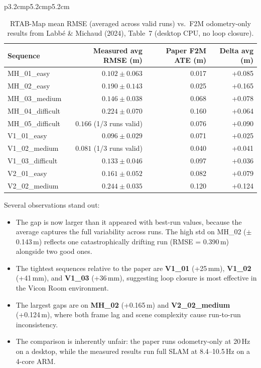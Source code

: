 \documentclass[11pt]{article}
\begin{document}
\begin{table}[ht]
\begin{tabular}{p{3.2cm}p{5.2cm}p{5.2cm}}
\begin{table}[H]
\centering
\small
\caption{RTAB-Map mean RMSE (averaged across valid runs) vs.\ F2M odometry-only results from Labb{\'e} \& Michaud (2024), Table~7 (desktop CPU, no loop closure).}
\label{tab:rtabmap_vs_paper}
\begin{tabular}{lrrr}
\toprule
Sequence & Measured avg RMSE (m) & Paper F2M ATE (m) & Delta avg (m) \\
\midrule
MH\_01\_easy       & $0.102 \pm 0.063$ & 0.017 & +0.085 \\
MH\_02\_easy       & $0.190 \pm 0.143$ & 0.025 & +0.165 \\
MH\_03\_medium     & $0.146 \pm 0.038$ & 0.068 & +0.078 \\
MH\_04\_difficult  & $0.224 \pm 0.070$ & 0.160 & +0.064 \\
MH\_05\_difficult  & $0.166$ (1/3 runs valid) & 0.076 & +0.090 \\
V1\_01\_easy       & $0.096 \pm 0.029$ & 0.071 & +0.025 \\
V1\_02\_medium     & $0.081$ (1/3 runs valid) & 0.040 & +0.041 \\
V1\_03\_difficult  & $0.133 \pm 0.046$ & 0.097 & +0.036 \\
V2\_01\_easy       & $0.161 \pm 0.052$ & 0.082 & +0.079 \\
V2\_02\_medium     & $0.244 \pm 0.035$ & 0.120 & +0.124 \\
\bottomrule
\end{tabular}
\end{table}

Several observations stand out:
\begin{itemize}
    \item The gap is now larger than it appeared with best-run values, because the average captures the full variability across runs. The high std on MH\_02 ($\pm$0.143\,m) reflects one catastrophically drifting run (RMSE = 0.390\,m) alongside two good ones.
    \item The tightest sequences relative to the paper are \textbf{V1\_01} (+25\,mm), \textbf{V1\_02} (+41\,mm), and \textbf{V1\_03} (+36\,mm), suggesting loop closure is most effective in the Vicon Room environment.
    \item The largest gaps are on \textbf{MH\_02} (+0.165\,m) and \textbf{V2\_02\_medium} (+0.124\,m), where both frame lag and scene complexity cause run-to-run inconsistency.
    \item The comparison is inherently unfair: the paper runs odometry-only at 20\,Hz on a desktop, while the measured results run full SLAM at 8.4--10.5\,Hz on a 4-core ARM.
\end{itemize}


\end{tabular}
\end{table}
\end{document}

